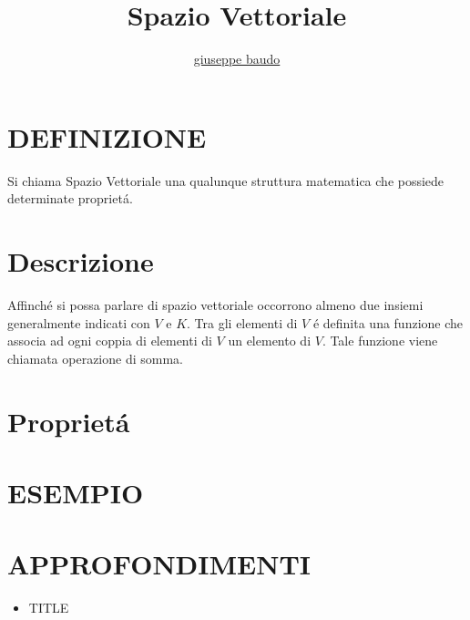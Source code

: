 \documentclass[a4paper,10pt]{article}
\title{Spazio Vettoriale}
\author{\href{http://www.baudo.hol.es}{giuseppe baudo}}
\begin{document}
\maketitle

\section{DEFINIZIONE}
Si chiama Spazio Vettoriale una qualunque struttura matematica che possiede determinate propriet\'{a}.

\section{Descrizione}
Affinch\'{e} si possa parlare di spazio vettoriale occorrono almeno due insiemi generalmente indicati con $V$ e $K$. Tra gli elementi di $V$ \'{e} definita
una funzione che associa ad ogni coppia di elementi di $V$ un elemento di $V$. Tale funzione viene chiamata operazione di somma.
\section{Propriet\'{a}}


\section{ESEMPIO}

\section{APPROFONDIMENTI}
\begin{itemize}
 \item TITLE
\end{itemize}
\end{document}

